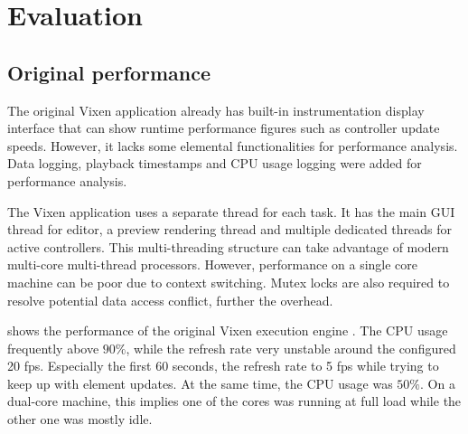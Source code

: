 \chapter{Evaluation}
\renewcommand{\baselinestretch}{\mystretch}
\label{chap:Eval}

\section{}

 


\section{Original performance}

The original Vixen application already has  built-in instrumentation display interface that can show runtime performance figures such as controller update speeds. However, it lacks some elemental functionalities for performance analysis. Data logging, playback timestamps and CPU usage logging were added for performance analysis.

The Vixen application uses a separate thread for each task. It has the main GUI thread for editor, a preview rendering thread and multiple dedicated threads for active controllers. This multi-threading structure can take advantage of modern multi-core multi-thread processors. However, performance on a single core machine can be poor due to context switching. Mutex locks are also required to resolve potential data access conflict, further  the overhead.

 shows the performance of the original Vixen execution engine . The CPU usage frequently  above $90 \%$, while the refresh rate  very unstable around the configured 20 fps. Especially  the first 60 seconds, the refresh rate  to 5 fps while trying to keep up with element updates. At the same time, the CPU usage was  $50 \%$. On a dual-core machine, this implies one of the cores was running at full load while the other one was mostly idle.

